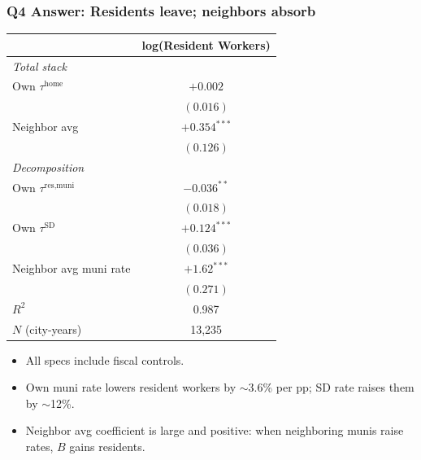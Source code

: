\documentclass[xcolor = x11names, compress, aspectratio = 169]{beamer}
\renewcommand{\(}{\begin{columns}}
\renewcommand{\)}{\end{columns}}
\newcommand{\<}[1]{\begin{column}{#1}}
\renewcommand{\>}{\end{column}}
\begin{document}
\begin{frame}
\frametitle{Q4 Answer: Residents leave; neighbors absorb}
    \centering
    \small
    \begin{tabular}{lc}
        \toprule
        & log(Resident Workers) \\
        \midrule
        \multicolumn{2}{l}{\textit{Total stack}} \\
        Own $\tau^{\text{home}}$            & $+0.002$ \\
                                             & $(0.016)$ \\
        Neighbor avg                         & $+0.354^{***}$ \\
                                             & $(0.126)$ \\
        \multicolumn{2}{l}{\textit{Decomposition}} \\
        Own $\tau^{\text{res,muni}}$         & $-0.036^{**}$ \\
                                             & $(0.018)$ \\
        Own $\tau^{\text{SD}}$               & $+0.124^{***}$ \\
                                             & $(0.036)$ \\
        Neighbor avg muni rate              & $+1.62^{***}$ \\
                                             & $(0.271)$ \\
        \midrule
        $R^2$                               & 0.987 \\
        $N$ (city-years)                    & 13{,}235 \\
        \bottomrule
    \end{tabular}
    \vspace{0.1cm}
    \begin{itemize}\setlength{\itemsep}{0.04cm}\small
        \item All specs include fiscal controls.
        \item Own muni rate lowers resident workers by $\sim$3.6\% per pp;
        SD rate raises them by $\sim$12\%.
        \item Neighbor avg coefficient is large and positive: when
        neighboring munis raise rates, $B$ gains residents.
    \end{itemize}
\end{frame}
\end{document}
